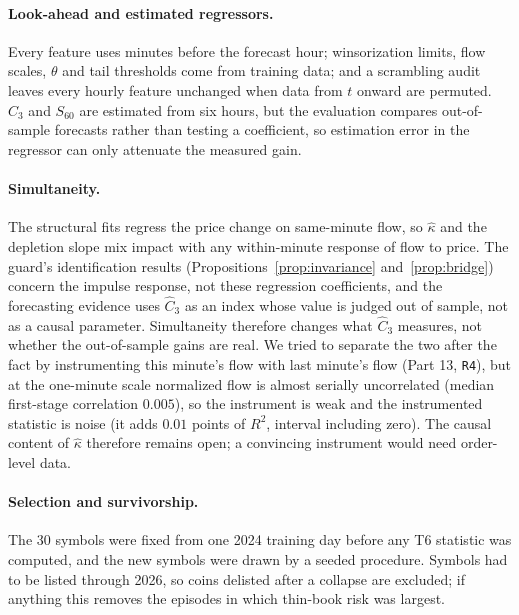 \documentclass[12pt]{article}
\theoremstyle{definition}
\theoremstyle{remark}
\begin{document}
\paragraph{Look-ahead and estimated regressors.} Every feature uses minutes before the forecast hour; winsorization limits, flow scales, $\theta$ and tail thresholds come from training data; and a scrambling audit leaves every hourly feature unchanged when data from $t$ onward are permuted. $\hat C_3$ and $S_{60}$ are estimated from six hours, but the evaluation compares out-of-sample forecasts rather than testing a coefficient, so estimation error in the regressor can only attenuate the measured gain.

\paragraph{Simultaneity.} The structural fits regress the price change on same-minute flow, so $\hat\kappa$ and the depletion slope mix impact with any within-minute response of flow to price. The guard's identification results (Propositions~\ref{prop:invariance} and~\ref{prop:bridge}) concern the impulse response, not these regression coefficients, and the forecasting evidence uses $\hat C_3$ as an index whose value is judged out of sample, not as a causal parameter. Simultaneity therefore changes what $\hat C_3$ measures, not whether the out-of-sample gains are real. We tried to separate the two after the fact by instrumenting this minute's flow with last minute's flow (Part 13, \texttt{R4}), but at the one-minute scale normalized flow is almost serially uncorrelated (median first-stage correlation $0.005$), so the instrument is weak and the instrumented statistic is noise (it adds $0.01$ points of $R^2$, interval including zero). The causal content of $\hat\kappa$ therefore remains open; a convincing instrument would need order-level data.

\paragraph{Selection and survivorship.} The 30 symbols were fixed from one 2024 training day before any T6 statistic was computed, and the new symbols were drawn by a seeded procedure. Symbols had to be listed through 2026, so coins delisted after a collapse are excluded; if anything this removes the episodes in which thin-book risk was largest.
\end{document}
